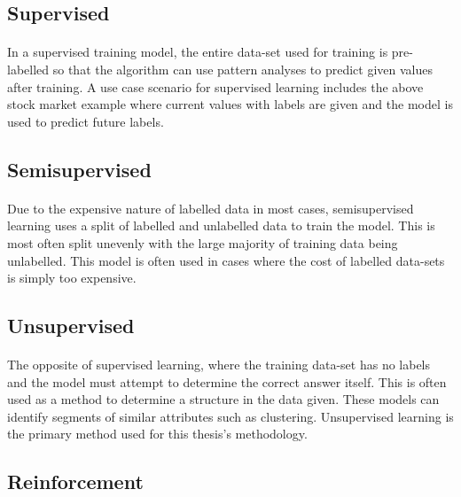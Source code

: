 \subsection{Supervised}
\label{ssec:subsection3}

\paragraph{}In a supervised training model, the entire data-set used for training is pre-labelled so that the algorithm can use pattern analyses to predict given values after training. A use case scenario for supervised learning includes the above stock market example where current values with labels are given and the model is used to predict future labels.

\subsection{Semisupervised} 
\label{ssec:subsection4}

\paragraph{}Due to the expensive nature of labelled data in most cases, semisupervised learning uses a split of labelled and unlabelled data to train the model. This is most often split unevenly with the large majority of training data being unlabelled. This model is often used in cases where the cost of labelled data-sets is simply too expensive.

\subsection{Unsupervised} 
\label{ssec:subsection5}

\paragraph{}The opposite of supervised learning, where the training data-set has no labels and the model must attempt to determine the correct answer itself. This is often used as a method to determine a structure in the data given. These models can identify segments of similar attributes such as clustering. Unsupervised learning is the primary method used for this thesis’s methodology.

\subsection{Reinforcement} 
\label{ssec:subsection6}
